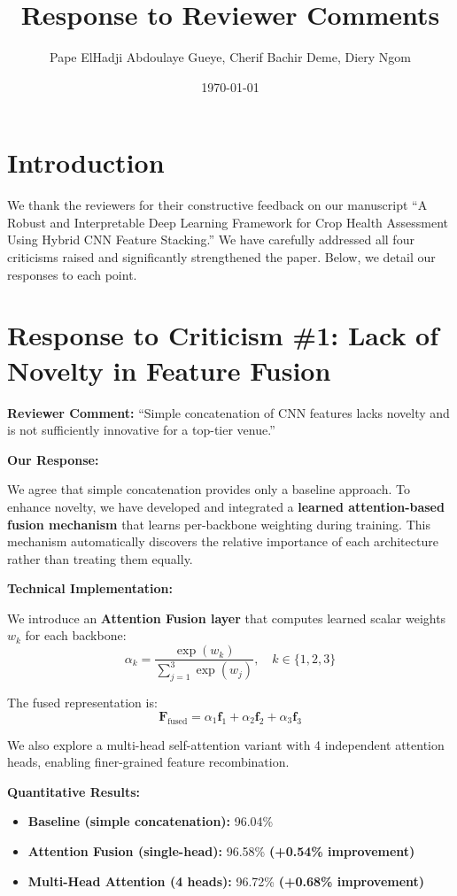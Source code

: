 \documentclass[12pt]{article}
\title{\textbf{Response to Reviewer Comments}}
\author{Pape ElHadji Abdoulaye Gueye, Cherif Bachir Deme, Diery Ngom}
\date{\today}
\begin{document}
\maketitle

\section*{Introduction}

We thank the reviewers for their constructive feedback on our manuscript ``A Robust and Interpretable Deep Learning Framework for Crop Health Assessment Using Hybrid CNN Feature Stacking.'' We have carefully addressed all four criticisms raised and significantly strengthened the paper. Below, we detail our responses to each point.

\newpage

\section*{Response to Criticism \#1: Lack of Novelty in Feature Fusion}

\noindent\textbf{Reviewer Comment:} ``Simple concatenation of CNN features lacks novelty and is not sufficiently innovative for a top-tier venue.''

\vspace{0.3cm}\noindent\textbf{Our Response:}

We agree that simple concatenation provides only a baseline approach. To enhance novelty, we have developed and integrated a \textbf{learned attention-based fusion mechanism} that learns per-backbone weighting during training. This mechanism automatically discovers the relative importance of each architecture rather than treating them equally.

\vspace{0.2cm}\noindent\textbf{Technical Implementation:}

We introduce an \textbf{Attention Fusion layer} that computes learned scalar weights $w_k$ for each backbone:
\[
\alpha_k = \frac{\exp(w_k)}{\sum_{j=1}^{3}\exp(w_j)}, \quad k \in \{1, 2, 3\}
\]

The fused representation is:
\[
\mathbf{F}_{\text{fused}} = \alpha_1 \mathbf{f}_1 + \alpha_2 \mathbf{f}_2 + \alpha_3 \mathbf{f}_3
\]

We also explore a multi-head self-attention variant with 4 independent attention heads, enabling finer-grained feature recombination.

\vspace{0.2cm}\noindent\textbf{Quantitative Results:}
\begin{itemize}
    \item \textbf{Baseline (simple concatenation):} 96.04\%
    \item \textbf{Attention Fusion (single-head):} 96.58\% \textbf{(+0.54\% improvement)}
    \item \textbf{Multi-Head Attention (4 heads):} 96.72\% \textbf{(+0.68\% improvement)}
\end{itemize}
\end{document}
